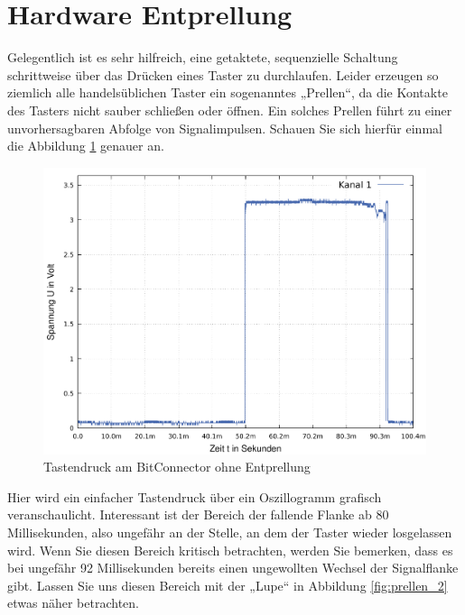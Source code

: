\documentclass{article}
\begin{document}
{\newpage

\section{Hardware Entprellung}
Gelegentlich ist es sehr hilfreich, eine getaktete, sequenzielle Schaltung schrittweise über das Drücken eines Taster zu durchlaufen. Leider erzeugen so ziemlich alle handelsüblichen Taster ein sogenanntes „Prellen“, da die Kontakte des Tasters nicht sauber schließen oder öffnen. Ein solches Prellen führt zu einer unvorhersagbaren Abfolge von Signalimpulsen. Schauen Sie sich hierfür einmal die Abbildung \ref{fig:prellen_1} genauer an. 

\begin{figure}[!h]
	\centering
	\includegraphics[width=0.92\linewidth]{Figures/bounce}
	\caption{Tastendruck am BitConnector ohne Entprellung}
	\label{fig:prellen_1}
\end{figure}

Hier wird ein einfacher Tastendruck über ein Oszillogramm grafisch veranschaulicht. Interessant ist der Bereich der fallende Flanke ab 80 Millisekunden, also ungefähr an der Stelle, an dem der Taster wieder losgelassen wird. Wenn Sie diesen Bereich kritisch betrachten, werden Sie bemerken, dass es bei ungefähr 92 Millisekunden bereits einen ungewollten Wechsel der Signalflanke gibt. Lassen Sie uns diesen Bereich mit der „Lupe“ in Abbildung \ref{fig:prellen_2} etwas näher betrachten.

}
\end{document}
